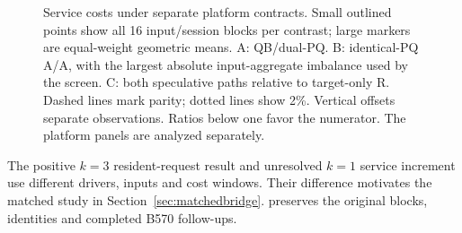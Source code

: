 \begin{figure}[t]
\centering
\caption{Service costs under separate platform contracts. Small outlined points show all 16 input/session blocks per contrast; large markers are equal-weight geometric means. A: QB/dual-PQ. B: identical-PQ A/A, with the largest absolute input-aggregate imbalance used by the screen. C: both speculative paths relative to target-only R. Dashed lines mark parity; dotted lines show 2\%. Vertical offsets separate observations. Ratios below one favor the numerator. The platform panels are analyzed separately.}
\label{fig:servicepanels}
\end{figure}

The positive $k=3$ resident-request result and unresolved $k=1$ service increment use different drivers, inputs and cost windows. Their difference motivates the matched study in Section~\ref{sec:matchedbridge}.  preserves the original blocks, identities and completed B570 follow-ups.
